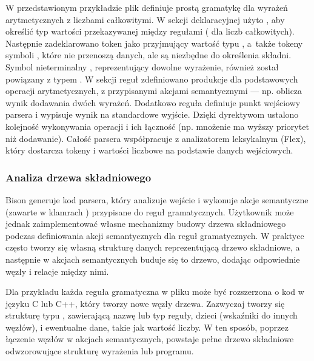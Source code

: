 \documentclass[12pt,twoside]{article}
\begin{document}


W przedstawionym przykładzie plik  definiuje prostą gramatykę dla wyrażeń arytmetycznych z liczbami całkowitymi. W sekcji deklaracyjnej użyto , aby określić typ wartości przekazywanej między regułami ( dla liczb całkowitych). Następnie zadeklarowano token  jako przyjmujący wartość typu , a~także tokeny symboli , które nie przenoszą danych, ale są niezbędne do określenia składni. Symbol nieterminalny , reprezentujący dowolne wyrażenie, również został powiązany z typem . W sekcji reguł zdefiniowano produkcje dla podstawowych operacji arytmetycznych, z przypisanymi akcjami semantycznymi — np.  oblicza wynik dodawania dwóch wyrażeń. Dodatkowo reguła  definiuje punkt wejściowy parsera i wypisuje wynik na standardowe wyjście. Dzięki dyrektywom  ustalono kolejność wykonywania operacji i ich łączność (np. mnożenie ma wyższy priorytet niż dodawanie). Całość parsera współpracuje z analizatorem leksykalnym (Flex), który dostarcza tokeny i wartości liczbowe na podstawie danych wejściowych.

\subsubsection{Analiza drzewa składniowego}

Bison generuje kod parsera, który analizuje wejście i wykonuje akcje semantyczne (zawarte w klamrach {}) przypisane do reguł gramatycznych. Użytkownik może jednak zaimplementować własne mechanizmy budowy drzewa składniowego podczas definiowania akcji semantycznych dla reguł gramatycznych. W praktyce często tworzy się własną strukturę danych reprezentującą drzewo składniowe, a następnie w akcjach semantycznych buduje się to drzewo, dodając odpowiednie węzły i relacje między nimi.

Dla przykładu każda reguła gramatyczna w pliku  może być rozszerzona o kod w języku C lub C++, który tworzy nowe węzły drzewa. Zazwyczaj tworzy się strukturę typu , zawierającą nazwę lub typ reguły, dzieci (wskaźniki do innych węzłów), i ewentualne dane, takie jak wartość liczby. W ten sposób, poprzez łączenie węzłów w akcjach semantycznych, powstaje pełne drzewo składniowe odwzorowujące strukturę wyrażenia lub programu.
\end{document}
